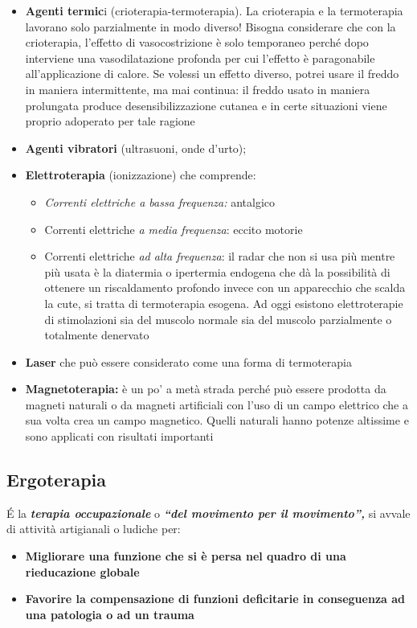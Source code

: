 \begin{itemize}
\item
  \textbf{Agenti termic}i (crioterapia-termoterapia). La crioterapia e la termoterapia lavorano solo parzialmente in modo diverso! Bisogna considerare che con la crioterapia, l'effetto di vasocostrizione è solo temporaneo perché dopo interviene una vasodilatazione profonda per cui l'effetto è paragonabile all'applicazione di calore. Se volessi un effetto diverso, potrei usare il freddo in maniera intermittente, ma mai continua: il freddo usato in maniera prolungata produce desensibilizzazione cutanea e in certe situazioni viene proprio adoperato per tale ragione
\item
  \textbf{Agenti vibratori} (ultrasuoni, onde d'urto);
\item
  \textbf{Elettroterapia} (ionizzazione) che comprende:
  \begin{itemize}
\item
  \emph{Correnti elettriche a bassa frequenza:} antalgico
\item
  Correnti elettriche \emph{a media frequenza}: eccito motorie
\item
  Correnti elettriche \emph{ad alta frequenza}: il radar che non si usa più mentre più usata è la diatermia o ipertermia endogena che dà la possibilità di ottenere un riscaldamento profondo invece con un apparecchio che scalda la cute, si tratta di termoterapia esogena. Ad oggi esistono elettroterapie di stimolazioni sia del muscolo normale sia del muscolo parzialmente o totalmente denervato
\end{itemize}
\item
  \textbf{Laser} che può essere considerato come una forma di termoterapia
\item
  \textbf{Magnetoterapia:} è un po' a metà strada perché può essere prodotta da magneti naturali o da magneti artificiali con l'uso di un campo elettrico che a sua volta crea un campo magnetico. Quelli naturali hanno potenze altissime e sono applicati con risultati importanti
\end{itemize}

\subsection{Ergoterapia}

É la \textbf{\emph{terapia occupazionale}} o \textbf{\emph{``del movimento per il movimento'',}} si avvale di attività artigianali o ludiche per:

\begin{itemize}
\item
  \textbf{Migliorare una funzione che si è persa nel quadro di una rieducazione globale }
\item
  \textbf{Favorire la compensazione di funzioni deficitarie in conseguenza ad una patologia o ad un trauma}
\end{itemize}


